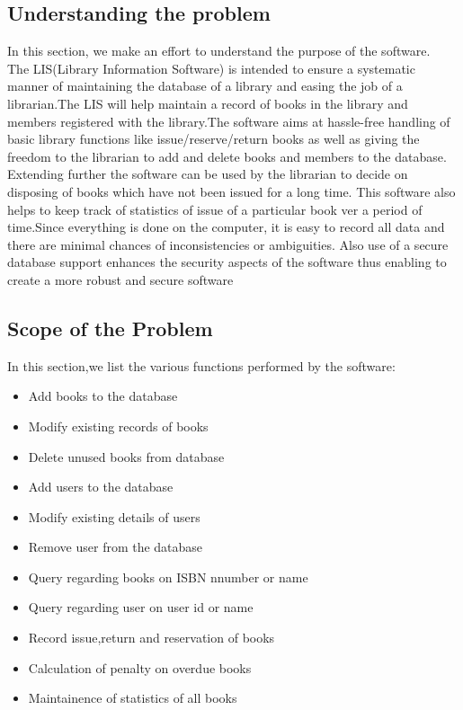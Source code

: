\documentclass[a4paper]{article}
\begin{document}
\subsection{Understanding the problem}
In this section, we make an effort to understand the purpose of the software.
\\
The LIS(Library Information Software) is intended to ensure a systematic manner of maintaining the database of a library and easing the job of a librarian.The LIS will help maintain a record of books in the library and members registered with the library.The software aims at hassle-free handling of basic library functions like issue/reserve/return books as well as giving the freedom to the librarian to add and delete books and members to the database.
	Extending further the software can be used by the librarian to decide on disposing of books which have not been issued for a long time. This software also helps to keep track of statistics of issue of a particular book ver a period of time.Since everything is done on the computer, it is easy to record all data and there are minimal chances of inconsistencies or ambiguities.
Also use of a secure database support enhances the security aspects of the software thus enabling to create a more robust and secure software
\subsection{Scope of the Problem}
In this section,we list the various functions performed by the software:
\begin{itemize}
\item Add books to the database
\item Modify existing records of books
\item Delete unused books from database
\item Add users to the database
\item Modify existing details of users
\item Remove user from the database
\item Query regarding books on ISBN nnumber or name
\item Query regarding user on user id or name
\item Record issue,return and reservation of books
\item Calculation of penalty on overdue books
\item Maintainence of statistics of all books 
\end{itemize}
\end{document}
